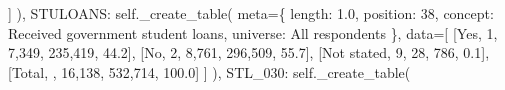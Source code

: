 \documentclass[
  11pt,
  a4paper,
]{article}
\newenvironment{Shaded}{\begin{snugshade}}{\end{snugshade}}
\newcommand{\NormalTok}[1]{\textcolor[rgb]{0.00,0.23,0.31}{#1}}
\newcommand{\OperatorTok}[1]{\textcolor[rgb]{0.37,0.37,0.37}{#1}}
\newcommand{\StringTok}[1]{\textcolor[rgb]{0.13,0.47,0.30}{#1}}
\newcommand{\VariableTok}[1]{\textcolor[rgb]{0.07,0.07,0.07}{#1}}
\begin{document}
\begin{Shaded}
\begin{Highlighting}[]
\NormalTok{                ]}
\NormalTok{            ),}
            \StringTok{\textquotesingle{}STULOANS\textquotesingle{}}\NormalTok{: }\VariableTok{self}\NormalTok{.\_create\_table(}
\NormalTok{                meta}\OperatorTok{=}\NormalTok{\{}
                    \StringTok{\textquotesingle{}length\textquotesingle{}}\NormalTok{: }\StringTok{\textquotesingle{}1.0\textquotesingle{}}\NormalTok{, }\StringTok{\textquotesingle{}position\textquotesingle{}}\NormalTok{: }\StringTok{\textquotesingle{}38\textquotesingle{}}\NormalTok{,}
                    \StringTok{\textquotesingle{}concept\textquotesingle{}}\NormalTok{: }\StringTok{\textquotesingle{}Received government student loans\textquotesingle{}}\NormalTok{,}
                    \StringTok{\textquotesingle{}universe\textquotesingle{}}\NormalTok{: }\StringTok{\textquotesingle{}All respondents\textquotesingle{}}
\NormalTok{                \},}
\NormalTok{                data}\OperatorTok{=}\NormalTok{[}
\NormalTok{                    [}\StringTok{\textquotesingle{}Yes\textquotesingle{}}\NormalTok{, }\StringTok{\textquotesingle{}1\textquotesingle{}}\NormalTok{, }\StringTok{\textquotesingle{}7,349\textquotesingle{}}\NormalTok{, }\StringTok{\textquotesingle{}235,419\textquotesingle{}}\NormalTok{, }\StringTok{\textquotesingle{}44.2\textquotesingle{}}\NormalTok{],}
\NormalTok{                    [}\StringTok{\textquotesingle{}No\textquotesingle{}}\NormalTok{, }\StringTok{\textquotesingle{}2\textquotesingle{}}\NormalTok{, }\StringTok{\textquotesingle{}8,761\textquotesingle{}}\NormalTok{, }\StringTok{\textquotesingle{}296,509\textquotesingle{}}\NormalTok{, }\StringTok{\textquotesingle{}55.7\textquotesingle{}}\NormalTok{],}
\NormalTok{                    [}\StringTok{\textquotesingle{}Not stated\textquotesingle{}}\NormalTok{, }\StringTok{\textquotesingle{}9\textquotesingle{}}\NormalTok{, }\StringTok{\textquotesingle{}28\textquotesingle{}}\NormalTok{, }\StringTok{\textquotesingle{}786\textquotesingle{}}\NormalTok{, }\StringTok{\textquotesingle{}0.1\textquotesingle{}}\NormalTok{],}
\NormalTok{                    [}\StringTok{\textquotesingle{}Total\textquotesingle{}}\NormalTok{, }\StringTok{\textquotesingle{}\textquotesingle{}}\NormalTok{, }\StringTok{\textquotesingle{}16,138\textquotesingle{}}\NormalTok{, }\StringTok{\textquotesingle{}532,714\textquotesingle{}}\NormalTok{, }\StringTok{\textquotesingle{}100.0\textquotesingle{}}\NormalTok{]}
\NormalTok{                ]}
\NormalTok{            ),}
            \StringTok{\textquotesingle{}STL\_030\textquotesingle{}}\NormalTok{: }\VariableTok{self}\NormalTok{.\_create\_table(}

\end{Highlighting}
\end{Shaded}
\end{document}
